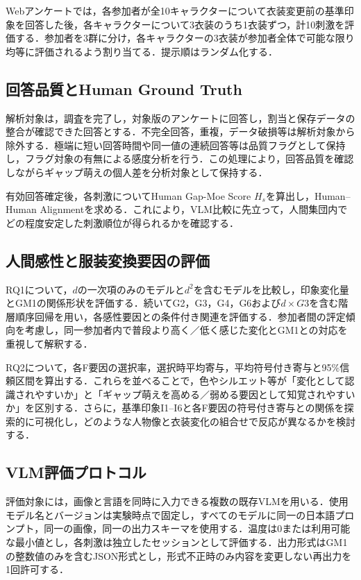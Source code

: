 \documentclass[a4j,twocolumn,11pt]{jarticle}
\begin{document}
Webアンケートでは，各参加者が全10キャラクターについて衣装変更前の基準印象を回答した後，各キャラクターについて3衣装のうち1衣装ずつ，計10刺激を評価する．参加者を3群に分け，各キャラクターの3衣装が参加者全体で可能な限り均等に評価されるよう割り当てる．提示順はランダム化する．

\subsection{回答品質とHuman Ground Truth}
解析対象は，調査を完了し，対象版のアンケートに回答し，割当と保存データの整合が確認できた回答とする．不完全回答，重複，データ破損等は解析対象から除外する．極端に短い回答時間や同一値の連続回答等は品質フラグとして保持し，フラグ対象の有無による感度分析を行う．この処理により，回答品質を確認しながらギャップ萌えの個人差を分析対象として保持する．

有効回答確定後，各刺激についてHuman Gap-Moe Score $H_s$を算出し，Human--Human Alignmentを求める．これにより，VLM比較に先立って，人間集団内でどの程度安定した刺激順位が得られるかを確認する．

\subsection{人間感性と服装変換要因の評価}
RQ1について，$d$の一次項のみのモデルと$d^2$を含むモデルを比較し，印象変化量とGM1の関係形状を評価する．続いてG2，G3，G4，G6および$d\times G3$を含む階層順序回帰を用い，各感性要因との条件付き関連を評価する．参加者間の評定傾向を考慮し，同一参加者内で普段より高く／低く感じた変化とGM1との対応を重視して解釈する．

RQ2について，各F要因の選択率，選択時平均寄与，平均符号付き寄与と95\%信頼区間を算出する．これらを並べることで，色やシルエット等が「変化として認識されやすいか」と「ギャップ萌えを高める／弱める要因として知覚されやすいか」を区別する．さらに，基準印象I1--I6と各F要因の符号付き寄与との関係を探索的に可視化し，どのような人物像と衣装変化の組合せで反応が異なるかを検討する．

\subsection{VLM評価プロトコル}
評価対象には，画像と言語を同時に入力できる複数の既存VLMを用いる．使用モデル名とバージョンは実験時点で固定し，すべてのモデルに同一の日本語プロンプト，同一の画像，同一の出力スキーマを使用する．温度は0または利用可能な最小値とし，各刺激は独立したセッションとして評価する．出力形式はGM1の整数値のみを含むJSON形式とし，形式不正時のみ内容を変更しない再出力を1回許可する．
\end{document}
